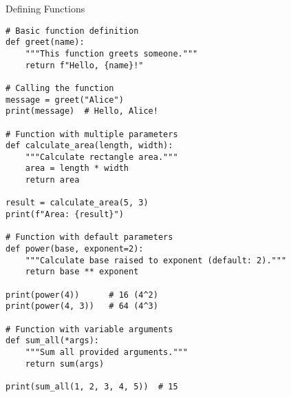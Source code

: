 \begin{frame}[fragile]{Defining Functions}
    \begin{codeblock}
        \begin{lstlisting}
# Basic function definition
def greet(name):
    """This function greets someone."""
    return f"Hello, {name}!"

# Calling the function
message = greet("Alice")
print(message)  # Hello, Alice!

# Function with multiple parameters
def calculate_area(length, width):
    """Calculate rectangle area."""
    area = length * width
    return area

result = calculate_area(5, 3)
print(f"Area: {result}")

# Function with default parameters
def power(base, exponent=2):
    """Calculate base raised to exponent (default: 2)."""
    return base ** exponent

print(power(4))      # 16 (4^2)
print(power(4, 3))   # 64 (4^3)

# Function with variable arguments
def sum_all(*args):
    """Sum all provided arguments."""
    return sum(args)

print(sum_all(1, 2, 3, 4, 5))  # 15
        \end{lstlisting}
    \end{codeblock}
\end{frame}

